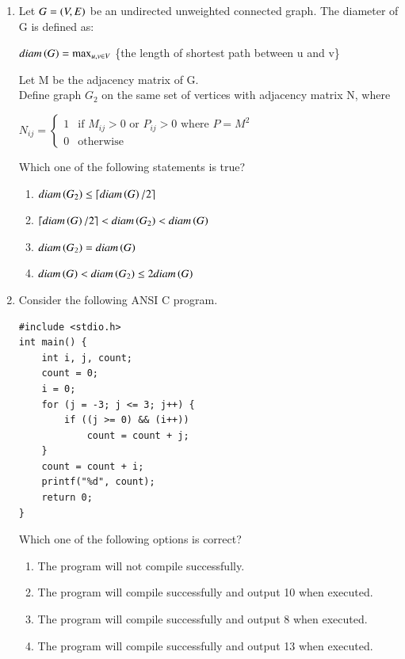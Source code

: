 \documentclass[a4paper, 11pt]{article}
\begin{document}
\begin{enumerate}
    \item Let $G=\left(V,E\right)$ be an undirected unweighted connected graph. The diameter of G is defined as:
    \begin{center}
    $diam\left(G\right) = \max_{u,v \in V}$ \{the length of shortest path between u and v\}
    \end{center}
    Let M be the adjacency matrix of G.\\Define graph $G_2$ on the same set of vertices with adjacency matrix N, where
    \begin{center}
    $N_{ij} = \begin{cases} 1 & \text{if } M_{ij} > 0 \text{ or } P_{ij} > 0 \text{ where } P=M^2 \\ 0 & \text{otherwise} \end{cases}$
    \end{center}
    Which one of the following statements is true?
    \begin{enumerate}
        \item $diam\left(G_2\right) \le \lceil diam\left(G\right)/2 \rceil$
        \item $\lceil diam\left(G\right)/2 \rceil < diam\left(G_2\right) < diam\left(G\right)$
        \item $diam\left(G_2\right) = diam\left(G\right)$
        \item $diam\left(G\right) < diam\left(G_2\right) \le 2 diam\left(G\right)$
    \end{enumerate}
    \hfill{}
    \item Consider the following ANSI C program.
    \begin{verbatim}
#include <stdio.h>
int main() {
    int i, j, count;
    count = 0;
    i = 0;
    for (j = -3; j <= 3; j++) {
        if ((j >= 0) && (i++))
            count = count + j;
    }
    count = count + i;
    printf("%d", count);
    return 0;
}
    \end{verbatim}
    Which one of the following options is correct?
    
    \begin{enumerate}
        \item The program will not compile successfully.
        \item The program will compile successfully and output 10 when executed.
        \item The program will compile successfully and output 8 when executed.
        \item The program will compile successfully and output 13 when executed.
    \end{enumerate}
    \hfill{}
    

\end{enumerate}
\end{document}

